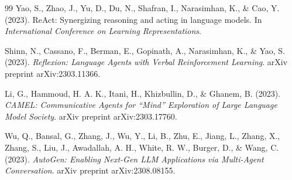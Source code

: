 \documentclass[12pt,a4paper]{article}
\begin{document}
\begin{thebibliography}{99}
Yao, S., Zhao, J., Yu, D., Du, N., Shafran, I., Narasimhan, K.,
\& Cao, Y. (2023).
ReAct: Synergizing reasoning and acting in language models.
In \textit{International Conference on Learning Representations}.



Shinn, N., Cassano, F., Berman, E., Gopinath, A., Narasimhan, K.,
\& Yao, S. (2023).
\textit{Reflexion: Language Agents with Verbal Reinforcement Learning}.
arXiv preprint arXiv:2303.11366.

Li, G., Hammoud, H. A. K., Itani, H., Khizbullin, D.,
\& Ghanem, B. (2023).
\textit{CAMEL: Communicative Agents for ``Mind'' Exploration of Large Language Model Society}.
arXiv preprint arXiv:2303.17760.

Wu, Q., Bansal, G., Zhang, J., Wu, Y., Li, B., Zhu, E., Jiang, L.,
Zhang, X., Zhang, S., Liu, J., Awadallah, A. H., White, R. W.,
Burger, D., \& Wang, C. (2023).
\textit{AutoGen: Enabling Next-Gen LLM Applications via Multi-Agent Conversation}.
arXiv preprint arXiv:2308.08155.


\end{thebibliography}
\end{document}
